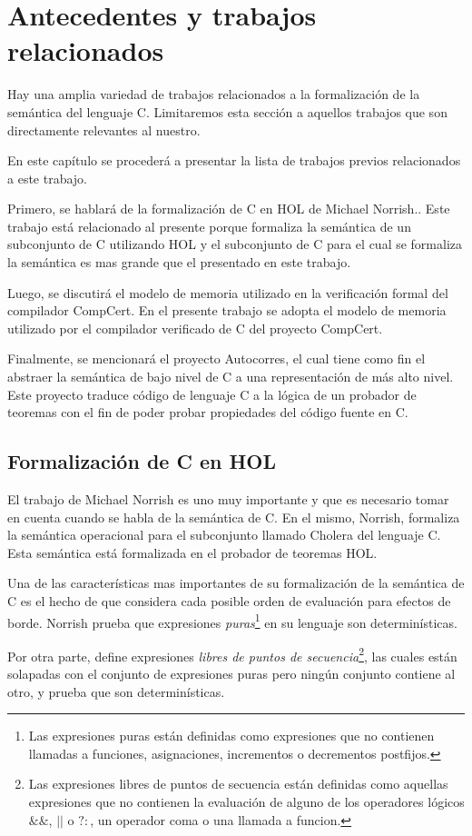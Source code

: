 \chapter{Antecedentes y trabajos relacionados}\label{chapter:previous}


Hay una amplia variedad de trabajos relacionados a la formalización de la semántica del lenguaje C.
Limitaremos esta sección a aquellos trabajos que son directamente relevantes al nuestro.

En este capítulo se procederá a presentar la lista de trabajos previos relacionados a este trabajo.

Primero, se hablará de la formalización de C en HOL de Michael Norrish.\cite{norrish}.
Este trabajo está relacionado al presente porque formaliza la semántica de un subconjunto de C utilizando HOL y el subconjunto de C para el cual se formaliza la semántica es mas grande que el presentado en este trabajo.

Luego, se discutirá el modelo de memoria utilizado en la verificación formal del compilador CompCert.\cite{leroy-blazy-memory-model}
En el presente trabajo se adopta el modelo de memoria utilizado por el compilador verificado de C del proyecto CompCert.

Finalmente, se mencionará el proyecto Autocorres\cite{autocorres}, el cual tiene como fin el abstraer la semántica de bajo nivel de C a una representación de más alto nivel.
Este proyecto traduce código de lenguaje C a la lógica de un probador de teoremas con el fin de poder probar propiedades del código fuente en C.

\section{Formalización de C en HOL}

El trabajo de Michael Norrish\cite{norrish} es uno muy importante y que es necesario tomar en cuenta cuando se habla de la semántica de C.
En el mismo, Norrish, formaliza la semántica operacional para el subconjunto llamado Cholera del lenguaje C.
Esta semántica está formalizada en el probador de teoremas HOL\cite{hol-doc}.

Una de las características mas importantes de su formalización de la semántica de C es el hecho de que considera cada posible orden de evaluación para efectos de borde.
Norrish prueba que expresiones \textit{puras}\footnote{Las expresiones puras están definidas como expresiones que no contienen llamadas a funciones, asignaciones, incrementos o decrementos postfijos.} en su lenguaje son determinísticas.
\begin{comment}
deterministic != determinístico
\end{comment}
Por otra parte, define expresiones \textit{libres de puntos de secuencia}\footnote{Las expresiones libres de puntos de secuencia están definidas como aquellas expresiones que no contienen la evaluación de alguno de los operadores lógicos $\&\&$, $||$ o $?:$, un operador coma o una llamada a funcion.}, las cuales están solapadas con el conjunto de expresiones puras pero ningún conjunto contiene al otro, y prueba que son determinísticas.

